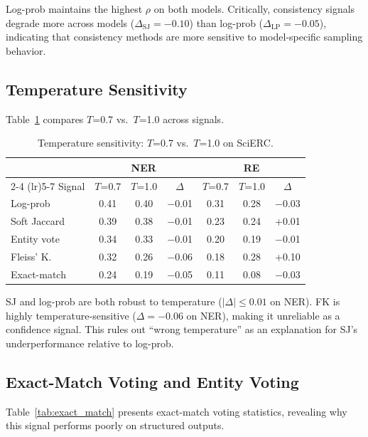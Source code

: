 \documentclass[11pt,a4paper]{article}
\begin{document}
Log-prob maintains the highest $\rho$ on both models. Critically, consistency signals degrade more across models ($\Delta_\text{SJ}=-0.10$) than log-prob ($\Delta_\text{LP}=-0.05$), indicating that consistency methods are more sensitive to model-specific sampling behavior.

\subsection{Temperature Sensitivity}

Table~\ref{tab:temperature} compares $T$=0.7 vs.\ $T$=1.0 across signals.

\begin{table}[t]
\centering
\small
\caption{Temperature sensitivity: $T$=0.7 vs.\ $T$=1.0 on SciERC.}
\label{tab:temperature}
\begin{tabular}{lcc@{\hskip 4pt}ccc@{\hskip 4pt}c}
\toprule
 & \multicolumn{3}{c}{NER} & \multicolumn{3}{c}{RE} \\
\cmidrule(lr){2-4} \cmidrule(lr){5-7}
Signal & $T$=0.7 & $T$=1.0 & $\Delta$ & $T$=0.7 & $T$=1.0 & $\Delta$ \\
\midrule
Log-prob    & 0.41 & 0.40 & $-$0.01 & 0.31 & 0.28 & $-$0.03 \\
Soft Jaccard & 0.39 & 0.38 & $-$0.01 & 0.23 & 0.24 & +0.01 \\
Entity vote  & 0.34 & 0.33 & $-$0.01 & 0.20 & 0.19 & $-$0.01 \\
Fleiss' K.   & 0.32 & 0.26 & $-$0.06 & 0.18 & 0.28 & +0.10 \\
Exact-match  & 0.24 & 0.19 & $-$0.05 & 0.11 & 0.08 & $-$0.03 \\
\bottomrule
\end{tabular}
\end{table}

SJ and log-prob are both robust to temperature ($|\Delta|\leq0.01$ on NER). FK is highly temperature-sensitive ($\Delta=-0.06$ on NER), making it unreliable as a confidence signal. This rules out ``wrong temperature'' as an explanation for SJ's underperformance relative to log-prob.

\subsection{Exact-Match Voting and Entity Voting}

Table~\ref{tab:exact_match} presents exact-match voting statistics, revealing why this signal performs poorly on structured outputs.
\end{document}
